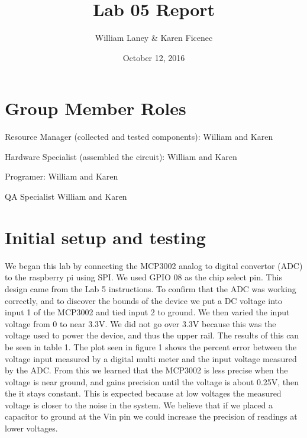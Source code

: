 \documentclass[prl,12pt,notitlepage,aps,onecolumn,superscriptaddress]{revtex4-1}
\begin{document}
\title{Lab 05 Report}
\author{William Laney \& Karen Ficenec}
\date{October 12, 2016}
\maketitle

\section{Group Member Roles}
Resource Manager (collected and tested components): William and Karen

Hardware Specialist (assembled the circuit): William and Karen

Programer: William and Karen

QA Specialist William and Karen

\section{Initial setup and testing}
We began this lab by connecting the MCP3002 analog to digital convertor (ADC) to the raspberry pi using SPI. We used GPIO 08 as the chip select pin. This design came from the Lab 5 instructions. To confirm that the ADC was working correctly, and to discover the bounds of the device we put a DC voltage into input 1 of the MCP3002 and tied input 2 to ground. We then varied the input voltage from 0 to near 3.3V. We did not go over 3.3V because this was the voltage used to power the device, and thus the upper rail. The results of this can be seen in table 1. The plot seen in figure 1 shows the percent error between the voltage input measured by a digital multi meter and the input voltage measured by the ADC. From this we learned that the MCP3002 is less precise when the voltage is near ground, and gains precision until the voltage is about 0.25V, then the it stays constant. This is expected because at low voltages the measured voltage is closer to the noise in the system. We believe that if we placed a capacitor to ground at the Vin pin we could increase the precision of readings at lower voltages.
\end{document}
